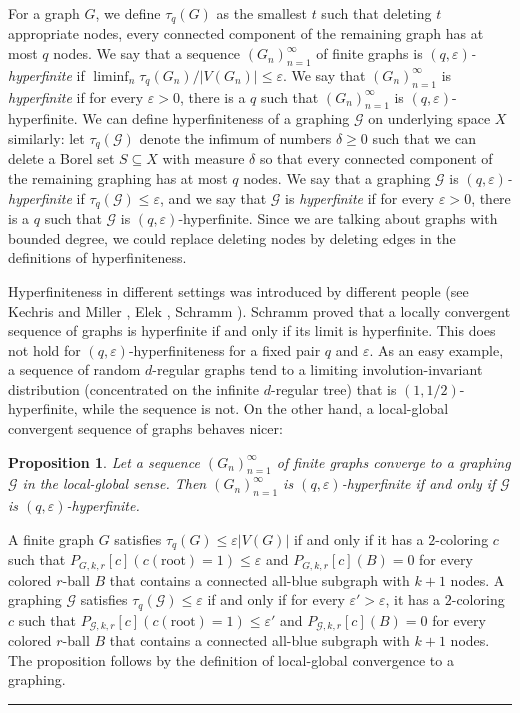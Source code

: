 \documentclass{article}
\newtheorem{proposition}[theorem]{Proposition}
\newenvironment{proof}{{\bf Proof.}}{\hfill\rule{2mm}{2mm}\medskip}
\def\GG{\mathcal{G}}\def\HH{\mathcal{H}}\def\II{\mathcal{I}}
\def\eps{\varepsilon}
\begin{document}
For a graph $G$, we define $\tau_q(G)$ as the smallest $t$ such that
deleting $t$ appropriate nodes, every connected component of the
remaining graph has at most $q$ nodes. We say that a sequence
$(G_n)_{n=1}^\infty$ of finite graphs is
\emph{$(q,\eps)$-hyperfinite} if
$\liminf_n\tau_q(G_n)/|V(G_n)|\le\eps$. We say that
$(G_n)_{n=1}^\infty$ is \emph{hyperfinite} if for every $\eps>0$,
there is a $q$ such that $(G_n)_{n=1}^\infty$ is
$(q,\eps)$-hyperfinite. We can define hyperfiniteness of a graphing
$\GG$ on underlying space $X$ similarly: let $\tau_q(\GG)$ denote the
infimum of numbers $\delta \ge 0$ such that we can delete a Borel set
$S\subseteq X$ with measure $\delta$ so that every connected
component of the remaining graphing has at most $q$ nodes. We say
that a graphing $\GG$ is \emph{$(q,\eps)$-hyperfinite} if
$\tau_q(\GG)\le\eps$, and we say that $\GG$ is \emph{hyperfinite} if
for every $\eps>0$, there is a $q$ such that $\GG$ is
$(q,\eps)$-hyperfinite. Since we are talking about graphs with
bounded degree, we could replace deleting nodes by deleting edges in
the definitions of hyperfiniteness.

Hyperfiniteness in different settings was introduced by different
people (see Kechris and Miller \cite{KM}, Elek \cite{Elek1}, Schramm
\cite{Schramm}). Schramm proved that a  locally convergent sequence of
graphs is hyperfinite if and only if its limit is hyperfinite. This
does not hold for $(q,\eps)$-hyperfiniteness for a fixed pair $q$ and
$\eps$. As an easy example, a sequence of random $d$-regular graphs
tend to a limiting involution-invariant distribution (concentrated on
the infinite $d$-regular tree) that is $(1,1/2)$-hyperfinite, while the
sequence is not. On the other hand, a local-global convergent
sequence of graphs behaves nicer:

\begin{proposition}\label{PROP:HYPERFIN}
Let a sequence $(G_n)_{n=1}^\infty$ of finite graphs converge to a
graphing $\GG$ in the local-global sense. Then $(G_n)_{n=1}^\infty$
is $(q,\eps)$-hyperfinite if and only if $\GG$ is
$(q,\eps)$-hyperfinite.
\end{proposition}
%
\begin{proof}
A finite graph $G$ satisfies $\tau_q(G)\le \eps|V(G)|$ if and only
if it has a $2$-coloring $c$ such that
$P_{G,k,r}[c](c(\text{root})=1)\le \eps$ and  $P_{G,k,r}[c](B)=0$ for
every colored $r$-ball $B$ that contains a connected all-blue
subgraph with $k+1$ nodes. A graphing $\GG$ satisfies $\tau_q(\GG)\le
\eps$ if and only if for every $\eps'>\eps$, it has a $2$-coloring $c$
such that $P_{\GG,k,r}[c](c(\text{root})=1)\le \eps'$ and
$P_{\GG,k,r}[c](B)=0$ for every colored $r$-ball $B$ that contains a
connected all-blue subgraph with $k+1$ nodes. The proposition follows
by the definition of local-global convergence to a graphing.
\end{proof}
\end{document}
